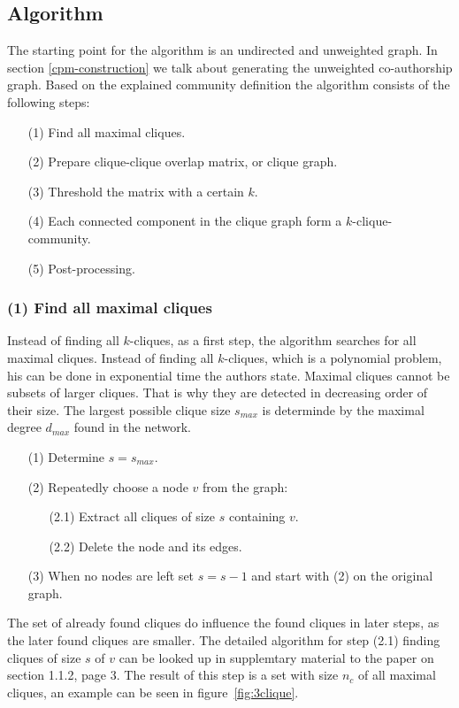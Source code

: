 \documentclass[runningheads,a4paper]{llncs}
\begin{document}
\subsection{Algorithm}
\label{cpm-algo}
The starting point for the algorithm is an undirected and unweighted graph. In section \ref{cpm-construction} we talk about generating the  unweighted co-authorship graph.
Based on the explained community definition the algorithm consists of the following steps:

\begin{enumerate}
\small
\item[(1)] Find all maximal cliques.
\item[(2)] Prepare clique-clique overlap matrix, or clique graph.
\item[(3)] Threshold the matrix with a certain $k$.
\item[(4)] Each connected component in the clique graph form a $k$-clique-community.
\item[(5)] Post-processing.
\end{enumerate}

\subsubsection{(1) Find all maximal cliques}
Instead of finding all $k$-cliques, as a first step, the algorithm searches for all maximal cliques. Instead of finding all $k$-cliques, which is a polynomial problem, his can be done in exponential time the authors state.
Maximal cliques cannot be subsets of larger cliques.
That is why they are detected in decreasing order of their size.
The largest possible clique size $s_{max}$ is determinde by the maximal degree $d_{max}$ found in the network.

\begin{enumerate}
\small
\item[(1)] Determine $s=s_{max}$.
\item[(2)] Repeatedly choose a node $v$ from the graph:
	\begin{enumerate}
		\item[(2.1)] Extract all cliques of size $s$ containing $v$.
		\item[(2.2)] Delete the node and its edges.
	\end{enumerate}
\item[(3)] When no nodes are left set $s=s-1$ and start with (2) on the original graph.
\end{enumerate}

The set of already found cliques do influence the found cliques in later steps, as the later found cliques are smaller.
The detailed algorithm for step (2.1) finding cliques of size $s$ of $v$ can be looked up in supplemtary material to the paper on section 1.1.2, page 3.
The result of this step is a set with size $n_c$ of all maximal cliques, an example can be seen in figure~\ref{fig:3clique}.
\end{document}
